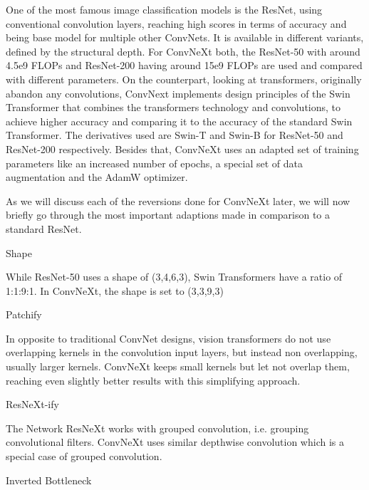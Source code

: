 \documentclass{article}
\begin{document}
One of the most famous image classification models is the ResNet, using conventional convolution layers, reaching high scores in terms of accuracy and being base model for multiple other ConvNets.
It is available in different variants, defined by the structural depth.
For ConvNeXt both, the ResNet-50 with around 4.5e9 FLOPs and ResNet-200 having around 15e9 FLOPs are used and compared with different parameters.
On the counterpart, looking at transformers, originally abandon any convolutions, ConvNext implements design principles of the Swin Transformer that combines the transformers technology and convolutions, to achieve higher accuracy and comparing it to the accuracy of the standard Swin Transformer.
The derivatives used are Swin-T and Swin-B for ResNet-50 and ResNet-200 respectively.
Besides that, ConvNeXt uses an adapted set of training parameters like an increased number of epochs, a special set of data augmentation and the AdamW optimizer.

As we will discuss each of the reversions done for ConvNeXt later, we will now briefly go through the most important adaptions made in comparison to a standard ResNet.

Shape

While ResNet-50 uses a shape of (3,4,6,3), Swin Transformers have a ratio of 1:1:9:1.
In ConvNeXt, the shape is set to (3,3,9,3)

Patchify

In opposite to traditional ConvNet designs, vision transformers do not use overlapping kernels in the convolution input layers, but instead non overlapping, usually larger kernels.
ConvNeXt keeps small kernels but let not overlap them, reaching even slightly better results with this simplifying approach.

ResNeXt-ify

The Network ResNeXt works with grouped convolution, i.e. grouping convolutional filters.
ConvNeXt uses similar depthwise convolution which is a special case of grouped convolution.

Inverted Bottleneck
\end{document}

